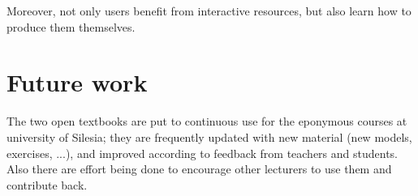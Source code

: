 \documentclass{deliverablereport}
\begin{document}
Moreover, not only users benefit from interactive resources, but also
learn how to produce them themselves.

\section{Future work}


The two open textbooks are put to continuous use for the eponymous
courses at university of Silesia; they are frequently updated with new
material (new models, exercises, ...), and improved according to
feedback from teachers and students. Also there are effort being done
to encourage other lecturers to use them and contribute back.
\end{document}
